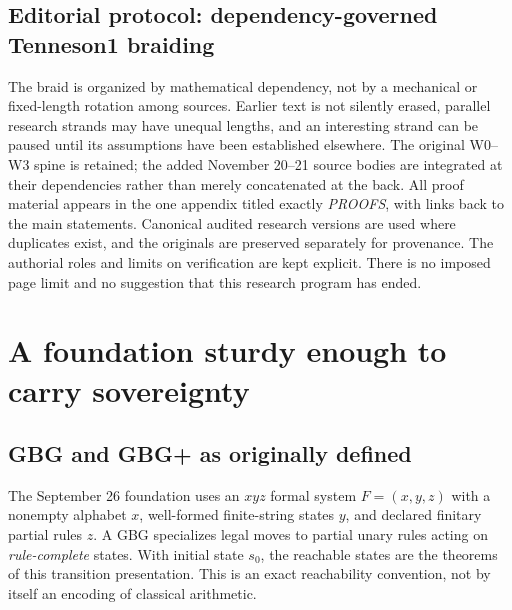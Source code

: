 \documentclass[11pt,letterpaper]{article}
\theoremstyle{definition}\newtheorem{definition}[theorem]{Definition}\newtheorem{example}[theorem]{Example}
\theoremstyle{remark}\newtheorem{remark}[theorem]{Remark}
\begin{document}
\subsection{Editorial protocol: dependency-governed Tenneson1 braiding}\label{br:sec:editorial}
The braid is organized by mathematical dependency, not by a mechanical or fixed-length rotation among sources. Earlier text is not silently erased, parallel research strands may have unequal lengths, and an interesting strand can be paused until its assumptions have been established elsewhere. The original W0--W3 spine is retained; the added November 20--21 source bodies are integrated at their dependencies rather than merely concatenated at the back. All proof material appears in the one appendix titled exactly \emph{PROOFS}, with links back to the main statements. Canonical audited research versions are used where duplicates exist, and the originals are preserved separately for provenance. The authorial roles and limits on verification are kept explicit. There is no imposed page limit and no suggestion that this research program has ended.

\section{A foundation sturdy enough to carry sovereignty}\label{sec:foundation}
\subsection{GBG and GBG+ as originally defined}
The September 26 foundation \cite{gbg} uses an $xyz$ formal system $F=(x,y,z)$ with a nonempty alphabet $x$, well-formed finite-string states $y$, and declared finitary partial rules $z$. A GBG specializes legal moves to partial unary rules acting on \emph{rule-complete} states. With initial state $s_0$, the reachable states are the theorems of this transition presentation. This is an exact reachability convention, not by itself an encoding of classical arithmetic.
\end{document}
